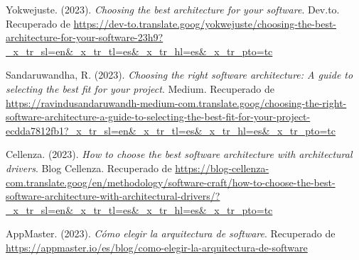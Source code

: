 \documentclass[12pt]{article}
\begin{document}
\begin{thebibliography}{9}

Yokwejuste. (2023). \textit{Choosing the best architecture for your software}. Dev.to. Recuperado de \url{https://dev-to.translate.goog/yokwejuste/choosing-the-best-architecture-for-your-software-23h9?_x_tr_sl=en&_x_tr_tl=es&_x_tr_hl=es&_x_tr_pto=tc}

Sandaruwandha, R. (2023). \textit{Choosing the right software architecture: A guide to selecting the best fit for your project}. Medium. Recuperado de \url{https://ravindusandaruwandh-medium-com.translate.goog/choosing-the-right-software-architecture-a-guide-to-selecting-the-best-fit-for-your-project-ecdda7812fb1?_x_tr_sl=en&_x_tr_tl=es&_x_tr_hl=es&_x_tr_pto=tc}

Cellenza. (2023). \textit{How to choose the best software architecture with architectural drivers}. Blog Cellenza. Recuperado de \url{https://blog-cellenza-com.translate.goog/en/methodology/software-craft/how-to-choose-the-best-software-architecture-with-architectural-drivers/?_x_tr_sl=en&_x_tr_tl=es&_x_tr_hl=es&_x_tr_pto=tc}

AppMaster. (2023). \textit{Cómo elegir la arquitectura de software}. Recuperado de \url{https://appmaster.io/es/blog/como-elegir-la-arquitectura-de-software}

\end{thebibliography}
\end{document}
